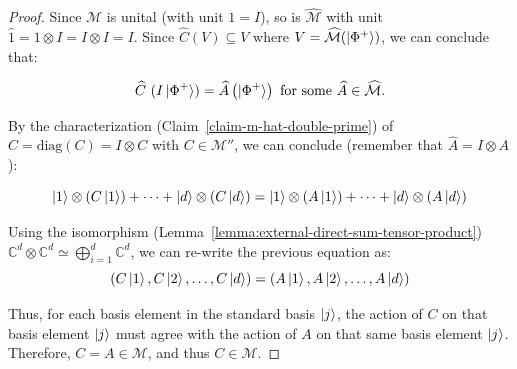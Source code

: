 \begin{proof}
Since $\mathcal{M}$ is unital (with unit $1 = I$), so is $\widehat{\mathcal{M}}$ with unit $\widehat{1} = 1 \otimes I = I \otimes I = I$. Since $\widehat{C}(V) \subseteq V$ where $V = \widehat{\mathcal{M}}(\ket{\Phi^+})$, we can conclude that:

\[
    \widehat{C}\ (I \ket{\Phi^+}) = \widehat{A} \left(\ket{\Phi^+}\right) \text{ for some } \widehat{A} \in \widehat{\mathcal{M}}.
\]

\noindent By the characterization (Claim~\ref{claim-m-hat-double-prime}) of $\widehat{C} = \text{diag}(C) = I \otimes C$ with $C \in \mathcal{M}''$, we can conclude (remember that $\widehat{A} = I \otimes A$):

\begin{equation}
    \ket{1} \otimes (C\ket{1}) + \dots + \ket{d} \otimes (C\ket{d}) = \ket{1} \otimes (A\ket{1}) + \dots + \ket{d} \otimes (A\ket{d})
\end{equation}

\noindent Using the isomorphism (Lemma~\ref{lemma:external-direct-sum-tensor-product}) $\mathbb{C}^d \otimes \mathbb{C}^d \simeq \bigoplus_{i = 1}^d \mathbb{C}^d$, we can re-write the previous equation as:
\begin{equation}
    \left(C\ket{1}, C\ket{2}, \dots, C\ket{d}\right) = \left(A\ket{1}, A\ket{2}, \dots, A\ket{d}\right)
\end{equation}

Thus, for each basis element in the standard basis $\ket{j}$, the action of $C$ on that basis element $\ket{j}$ must agree with the action of $A$ on that same basis element $\ket{j}$. Therefore, $C = A \in \mathcal{M}$, and thus $C \in \mathcal{M}$.

\end{proof}
